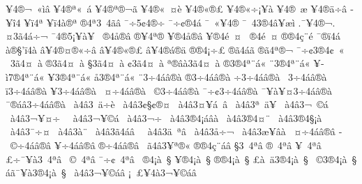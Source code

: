 {^^ad^^a54^^ae^^ac^^a0^^ab^^ec^^e2
^^ad^^a54^^ae^^aa^^ab^^a0^^e1
^^ad^^a54^^ae^^aa^^ae^^ac^^e3^^ad
^^ad^^a54^^ae^^ab^^a0^^ad^^a4^^e8
^^ad^^a54^^ae^^ab^^ae^^a3
^^ad^^a54^^ae^^ab^^f7^^a1^^a5^^e0
^^ad^^a54^^ae^^ad^^a0^^e6
^^ad^^a54^^ae^^e4^^f7^^e2
^^ad^^a5^^ee4^^ad
^^ad^^a5^^ef4^^aa
^^ad^^a5^^ef4^^e0^^ae^^aa 
^^ad^^ae4^^aa3^^a04^^e3^^e2 
^^af^^f75^^a24^^ae^^ad^^f7
^^af^^f7^^a2^^ae4^^e1
^^af^^a0^^ab^^a54^^ae
^^af^^a04^^ad3^^ae4^^e2^^a5^^e6^^ec
.^^af^^a54^^ae^^ac.
^^a43^^e34^^e1^^f7^^ac
^^af4^^ae5^^a1^^a5^^e0^^a5
^^a0^^ae4^^e5^^ae^^e2
^^ae^^a54^^aa^^ae
^^a5^^ae4^^e5^^ae^^e2
^^a5^^ae4^^e9^^a0^^a4
^^a0^^ae4^^e9^^a0^^a4
^^ae^^ae4^^e7^^a8^^e9
^^af^^ae^^ef4^^e1
^^e0^^ae^^a7'^^ef4^^e0
^^e2^^a54^^ae^^a4^^ae^^ab^^f7^^e2
^^e2^^a54^^ae^^ab^^ae^^a3
^^e2^^a54^^ae^^e1^^ae^^e4
^^ae^^ae4^^a1^^f7^^a3
^^ae^^e34^^e1^^e3^^ad
^^ae^^e34^^aa^^ae^^ac
^^af^^f7^^a23^^ae4^^a2^^a0^^ab
^^a03^^e34^^a4^^a0^^e0
^^ae3^^e34^^a4^^a0^^e0
^^a73^^e34^^a4^^a0^^e0
^^a23^^e34^^a4^^a0^^e0
^^aa^^ae^^ad^^e2^^e03^^e34^^a4^^a0^^e0
^^ae3^^ae4^^aa^^a8^^e1^^ab
^^a83^^ae4^^aa^^a8^^e1^^ab
^^a5^^ad^^ec7^^ae4^^aa^^a8^^e1^^ab
^^a53^^ae4^^aa^^a8^^e1^^ab
^^e53^^ae4^^aa^^a8^^e1^^ab
^^a83^^f74^^e1^^e2^^ae^^e0
^^ae3^^f74^^e1^^e2^^ae^^e0
^^f73^^f74^^e1^^e2^^ae^^e0
^^a03^^f74^^e1^^e2^^ae^^e0
^^ef3^^f74^^e1^^e2^^ae^^e0
^^a53^^f74^^e1^^e2^^ae^^e0
^^ad^^a0^^a4^^f74^^e1^^e2^^ae^^e0
^^ad^^a0^^a93^^f74^^e1^^e2^^ae^^e0
^^af^^f7^^a23^^f74^^e1^^e2^^ae^^e0
^^af^^a5^^e0^^a5^^a43^^f74^^e1^^e2^^ae^^e0
^^af^^ae^^e1^^e23^^f74^^e1^^e2^^ae^^e0
^^a0^^e04^^e23^^a0^^e4^^f7^^e8
^^a0^^e04^^e23^^a2^^a7^^a2^^ae^^a4
^^a0^^e04^^e23^^a4^^a5^^e1^^a0^^ad^^e2
^^a0^^e04^^e23^^aa^^a0^^e4^^a5
^^a0^^e04^^e23^^ac^^a0^^a9^^e1
^^a0^^e04^^e23^^ac^^a5^^a4^^f7^^a0
^^a0^^e04^^e23^^ac^^a5^^a9^^e1
^^a0^^e04^^e23^^ac^^f7^^ad
^^a0^^e04^^e23^^ae4^^a1^^e1^^e2^^e0
^^a0^^e04^^e23^^ae4^^a4^^a8^^ad
^^a0^^e04^^e23^^ae4^^a7^^a1^^e0
^^a0^^e04^^e23^^af^^f7^^a4
^^a0^^e04^^e23^^e0^^a8^^ad
^^a0^^e04^^e23^^e34^^e1^^e2^^a0^^ad
^^a0^^e04^^e23^^e4^^a0^^aa^^e2
^^a0^^e04^^e23^^e5^^f7^^ac
^^a0^^e04^^e23^^e6^^a5^^ad^^e2^^e0
^^ad^^a0^^a4^^f74^^e1^^e2^^ae^^e2
^^ad^^a0^^a9^^f74^^e1^^e2^^ae^^e2
^^a5^^f74^^e1^^e2^^ae^^e2
^^ae^^f74^^e1^^e2^^ae^^e2
^^a0^^e34^^e23^^a5^^aa^^ae^^ab
^^ae^^ae4^^e7^^a8^^e1^^e2
^^a73^^a04^^aa^^e2
^^ae^^a04^^aa^^e2
^^a5^^a04^^aa^^e2
^^a3^^f7^^af^^a5^^e03^^a04^^aa^^e2
^^ad^^a0^^a9^^a04^^aa^^e2 
^^af^^f7^^a2^^a04^^aa^^e2
^^a0^^ae4^^a1^^e0^^a0^^a7
^^a5^^ae4^^a1^^e0^^a0^^a7
^^ae^^ae4^^a1^^e0^^a0^^a7
^^a3^^e0^^a0^^e43^^ae4^^a1^^e0^^a0^^a7
^^ad^^a0^^a93^^ae4^^a1^^e0^^a0^^a7
^^e1^^e3^^af^^a5^^e03^^ae4^^a1^^e0^^a0^^a7
^^a0^^e04^^e23^^ac^^a5^^a9^^e1^^e2
^^a1^^a0^^a3^^a54^^e03^^ac^^a5^^a9^^e1^^e2
}
